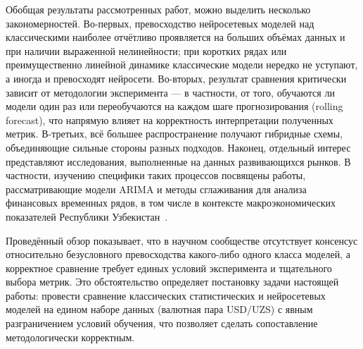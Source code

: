 Обобщая результаты рассмотренных работ, можно выделить несколько закономерностей. Во-первых, превосходство нейросетевых моделей над классическими наиболее отчётливо проявляется на больших объёмах данных и при наличии выраженной нелинейности; при коротких рядах или преимущественно линейной динамике классические модели нередко не уступают, а иногда и превосходят нейросети. Во-вторых, результат сравнения критически зависит от методологии эксперимента — в частности, от того, обучаются ли модели один раз или переобучаются на каждом шаге прогнозирования (rolling forecast), что напрямую влияет на корректность интерпретации полученных метрик. В-третьих, всё большее распространение получают гибридные схемы, объединяющие сильные стороны разных подходов. Наконец, отдельный интерес представляют исследования, выполненные на данных развивающихся рынков. В частности, изучению специфики таких процессов посвящены работы, рассматривающие модели ARIMA и методы сглаживания для анализа финансовых временных рядов, в том числе в контексте макроэкономических показателей Республики Узбекистан~\cite{bagaev2026}.

Проведённый обзор показывает, что в научном сообществе отсутствует консенсус относительно безусловного превосходства какого-либо одного класса моделей, а корректное сравнение требует единых условий эксперимента и тщательного выбора метрик. Это обстоятельство определяет постановку задачи настоящей работы: провести сравнение классических статистических и нейросетевых моделей на едином наборе данных (валютная пара USD/UZS) с явным разграничением условий обучения, что позволяет сделать сопоставление методологически корректным.